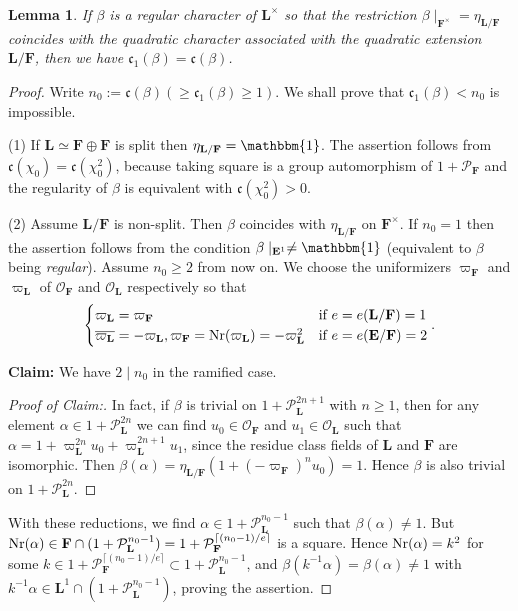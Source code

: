 \documentclass[A4]{amsart}
\def\geq{\geqslant}
\newtheorem{lemma}      [theorem]{Lemma}
\numberwithin{equation}{section} \everymath{\displaystyle}
\newcommand{\Nr}{{\rm Nr}}
\newcommand{\id}{\mathbbm{1}}
\newcommand{\E}{\mathbf{E}}
\newcommand{\F}{\mathbf{F}}
\newcommand{\bL}{\mathbf{L}}
\newcommand{\vO}{\mathcal{O}}
\newcommand{\vP}{\mathcal{P}}
\newcommand{\cond}{\mathfrak{c}}
\begin{document}
\begin{lemma} \label{lem: CondReInterp}
	 If $\beta$ is a regular character of $\bL^{\times}$ so that the restriction $\beta \mid_{\F^{\times}} = \eta_{\bL/\F}$ coincides with the quadratic character associated with the quadratic extension $\bL/\F$, then we have $\cond_1(\beta) = \cond(\beta)$.
\end{lemma}
\begin{proof}
	Write $n_0 := \cond(\beta) (\geq \cond_1(\beta) \geq 1)$. We shall prove that $\cond_1(\beta) < n_0$ is impossible.
	
\noindent (1) If $\bL \simeq \F \oplus \F$ is split then $\eta_{\bL/\F}=\id$. The assertion follows from $\cond(\chi_0) = \cond(\chi_0^2)$, because taking square is a group automorphism of $1+\vP_{\F}$ and the regularity of $\beta$ is equivalent with $\cond(\chi_0^2) > 0$.
	
\noindent (2) Assume $\bL/\F$ is non-split. Then $\beta$ coincides with $\eta_{\bL/\F}$ on $\F^{\times}$. If $n_0=1$ then the assertion follows from the condition $\beta \mid_{\E^1} \neq \id$ (equivalent to $\beta$ being \emph{regular}). Assume $n_0 \geq 2$ from now on. We choose the uniformizers $\varpi_{\F}$ and $\varpi_{\bL}$ of $\vO_{\F}$ and $\vO_{\bL}$ respectively so that 
\begin{equation} \label{eq: UnifChoice}
	\begin{cases}
		\varpi_{\bL} = \varpi_{\F} & \text{if } e=e(\bL/\F)=1 \\
		\overline{\varpi_{\bL}} = - \varpi_{\bL}, \varpi_{\F} = \Nr(\varpi_{\bL}) = - \varpi_{\bL}^2 & \text{if } e=e(\E/\F)=2
	\end{cases}.
\end{equation}

\noindent \textbf{Claim:} We have $2 \mid n_0$ in the ramified case.
\begin{proof}[Proof of Claim:] 
	In fact, if $\beta$ is trivial on $1+\vP_{\bL}^{2n+1}$ with $n \geq 1$, then for any element $\alpha \in 1+\vP_{\bL}^{2n}$ we can find $u_0 \in \vO_{\F}$ and $u_1 \in \vO_{\bL}$ such that $\alpha = 1 + \varpi_{\bL}^{2n} u_0 + \varpi_{\bL}^{2n+1}u_1$, since the residue class fields of $\bL$ and $\F$ are isomorphic. Then $\beta(\alpha) = \eta_{\bL/\F}(1+(-\varpi_{\F})^n u_0) = 1$. Hence $\beta$ is also trivial on $1+\vP_{\bL}^{2n}$.
\end{proof}
	
\noindent With these reductions, we find $\alpha \in 1+\vP_{\bL}^{n_0-1}$ such that $\beta(\alpha) \neq 1$. But $\Nr(\alpha) \in \F \cap (1+\vP_{\bL}^{n_0-1}) = 1+\vP_{\F}^{\lceil (n_0-1)/e \rceil}$ is a square. Hence $\Nr(\alpha) = k^2$ for some $k \in 1+\vP_{\F}^{\lceil (n_0-1)/e \rceil} \subset 1+\vP_{\bL}^{n_0-1}$, and $\beta(k^{-1}\alpha) = \beta(\alpha) \neq 1$ with $k^{-1} \alpha \in \bL^1 \cap (1+\vP_{\bL}^{n_0-1})$, proving the assertion.
\end{proof}
\end{document}
